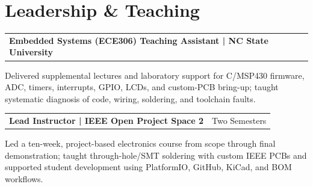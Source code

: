 \documentclass[10pt,letterpaper]{article}
\makeatletter
\newcommand{\resumeentry}[2]{%
  \begin{tabularx}{\textwidth}{@{}X>{\raggedleft\arraybackslash}p{2.50in}@{}}
    \textbf{#1} & #2
  \end{tabularx}\vspace{-0.06cm}
}
\makeatother
\begin{document}
\section{Leadership \& Teaching}
\resumeentry{Embedded Systems (ECE306) Teaching Assistant | NC State University}{}
\begin{resumebullets}
  \item Delivered supplemental lectures and laboratory support for C/MSP430 firmware, ADC, timers, interrupts, GPIO, LCDs, and custom-PCB bring-up; taught systematic diagnosis of code, wiring, soldering, and toolchain faults.
\end{resumebullets}

\resumeentry{Lead Instructor | IEEE Open Project Space 2}{Two Semesters}
\begin{resumebullets}
  \item Led a ten-week, project-based electronics course from scope through final demonstration; taught through-hole/SMT soldering with custom IEEE PCBs and supported student development using PlatformIO, GitHub, KiCad, and BOM workflows.
\end{resumebullets}
\end{document}
